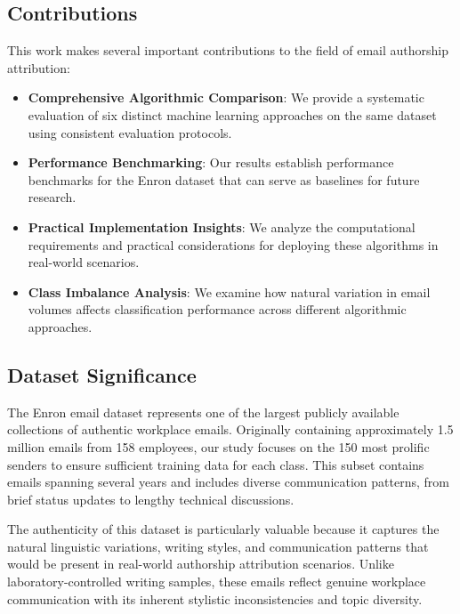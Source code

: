 \documentclass[11pt,a4paper]{article}
\begin{document}
\subsection{Contributions}

This work makes several important contributions to the field of email authorship attribution:

\begin{itemize}
    \item \textbf{Comprehensive Algorithmic Comparison}: We provide a systematic evaluation of six distinct machine learning approaches on the same dataset using consistent evaluation protocols.
    
    \item \textbf{Performance Benchmarking}: Our results establish performance benchmarks for the Enron dataset that can serve as baselines for future research.
    
    \item \textbf{Practical Implementation Insights}: We analyze the computational requirements and practical considerations for deploying these algorithms in real-world scenarios.
    
    \item \textbf{Class Imbalance Analysis}: We examine how natural variation in email volumes affects classification performance across different algorithmic approaches.
\end{itemize}

\subsection{Dataset Significance}

The Enron email dataset represents one of the largest publicly available collections of authentic workplace emails. Originally containing approximately 1.5 million emails from 158 employees, our study focuses on the 150 most prolific senders to ensure sufficient training data for each class. This subset contains emails spanning several years and includes diverse communication patterns, from brief status updates to lengthy technical discussions.

The authenticity of this dataset is particularly valuable because it captures the natural linguistic variations, writing styles, and communication patterns that would be present in real-world authorship attribution scenarios. Unlike laboratory-controlled writing samples, these emails reflect genuine workplace communication with its inherent stylistic inconsistencies and topic diversity.
\end{document}
